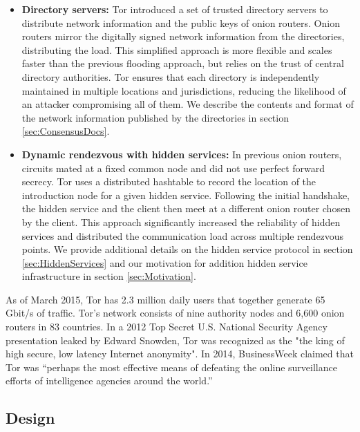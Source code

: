 \begin{itemize}
	\item \textbf{Directory servers:} Tor introduced a set of trusted directory servers to distribute network information and the public keys of onion routers. Onion routers mirror the digitally signed network information from the directories, distributing the load. This simplified approach is more flexible and scales faster than the previous flooding approach, but relies on the trust of central directory authorities. Tor ensures that each directory is independently maintained in multiple locations and jurisdictions, reducing the likelihood of an attacker compromising all of them.\cite{syverson2011peel} We describe the contents and format of the network information published by the directories in section \ref{sec:ConsensusDocs}.
	\item \textbf{Dynamic rendezvous with hidden services:} In previous onion routers, circuits mated at a fixed common node and did not use perfect forward secrecy. Tor uses a distributed hashtable to record the location of the introduction node for a given hidden service. Following the initial handshake, the hidden service and the client then meet at a different onion router chosen by the client. This approach significantly increased the reliability of hidden services and distributed the communication load across multiple rendezvous points.\cite{dingledine2004tor} We provide additional details on the hidden service protocol in section \ref{sec:HiddenServices} and our motivation for addition hidden service infrastructure in section \ref{sec:Motivation}.
\end{itemize}

As of March 2015, Tor has 2.3 million daily users that together generate 65 Gbit/s of traffic. Tor's network consists of nine authority nodes and 6,600 onion routers in 83 countries.\cite{TorMetrics} In a 2012 Top Secret U.S. National Security Agency presentation leaked by Edward Snowden, Tor was recognized as the "the king of high secure, low latency Internet anonymity".\cite{landau2014highlights}\cite{plak2014anonymous} In 2014, BusinessWeek claimed that Tor was ``perhaps the most effective means of defeating the online surveillance efforts of intelligence agencies around the world.''\cite{TorBusinessWeek}

\subsection{Design}

